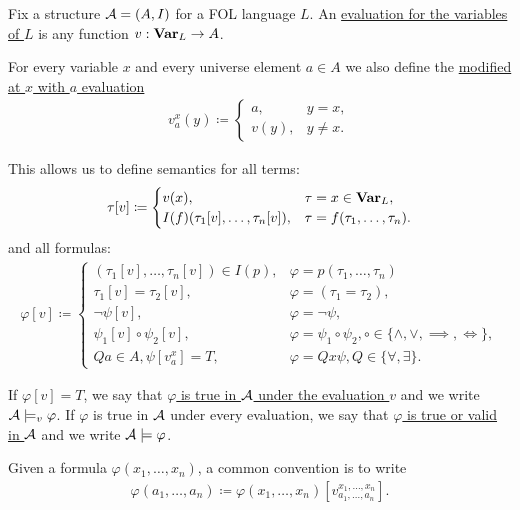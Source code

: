 \begin{definition}\label{def:first_order_variable_evaluation}\cite[25]{Lectures:logic_programming}
  Fix a structure $\mathcal A = (A, I)$ for a FOL language $L$. An \uline{evaluation for the variables of $L$} is any function $v: \operatorname{\mathbf{Var}}_L \to A$.

  For every variable $x$ and every universe element $a \in A$ we also define the \uline{modified at $x$ with $a$ evaluation}
  \begin{align*}
    v_a^x(y) \coloneqq \begin{cases}
      a,    &y = x, \\
      v(y), &y \neq x.
    \end{cases}
  \end{align*}

  This allows us to define semantics for all terms:
  \begin{align*}
    \tau[v] \coloneqq \begin{cases}
      v(x),                               &\tau = x \in \operatorname{\mathbf{Var}}_L, \\
      I(f)(\tau_1[v], \ldots, \tau_n[v]), &\tau = f(\tau_1, \ldots, \tau_n).
    \end{cases}
  \end{align*}
  and all formulas:
  \begin{align*}
    \varphi[v] \coloneqq \begin{cases}
      (\tau_1[v], \ldots, \tau_n[v]) \in I(p), &\varphi = p(\tau_1, \ldots, \tau_n) \\
      \tau_1[v] = \tau_2[v],                   &\varphi = (\tau_1 = \tau_2), \\
      \neg \psi[v],                            &\varphi = \neg \psi, \\
      \psi_1[v] \circ \psi_2[v],               &\varphi = \psi_1 \circ \psi_2, \circ \in \{ \land, \lor, \implies, \iff \}, \\
      Q a \in A, \psi[v_a^x] = T,              &\varphi = Q x \psi, Q \in \{ \forall, \exists \}.
    \end{cases}
  \end{align*}

  If $\varphi[v] = T$, we say that \uline{$\varphi$ is true in $\mathcal A$ under the evaluation $v$} and we write $\mathcal A \models_v \varphi$. If $\varphi$ is true in $\mathcal A$ under every evaluation, we say that \uline{$\varphi$ is true or valid in $\mathcal A$} and we write $\mathcal A \models \varphi$.

  Given a formula $\varphi(x_1, \ldots, x_n)$, a common convention is to write
  \begin{align*}
    \varphi(a_1, \ldots, a_n) \coloneqq \varphi(x_1, \ldots, x_n)[v_{a_1, \ldots, a_n}^{x_1, \ldots, x_n}].
  \end{align*}
\end{definition}

